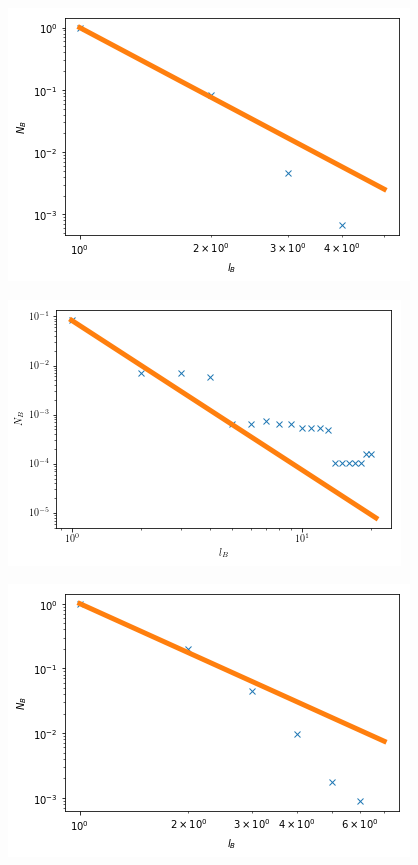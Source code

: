 \documentclass[12pt,twoside]{report}
\begin{document}
\begin{center}
\begin{minipage}{0.45\linewidth}
\includegraphics[width=\linewidth]{figures/ba_hausdorff.png}
\end{minipage}%
\hfill
\begin{minipage}{0.45\linewidth}
\includegraphics[width=\linewidth]{figures/song_hausdorff.png}
\end{minipage}%
\hfill
\begin{minipage}{0.45\linewidth}
\includegraphics[width=\linewidth]{figures/uvl_hausdorff.png}

\end{minipage}
\end{center}
\end{document}
